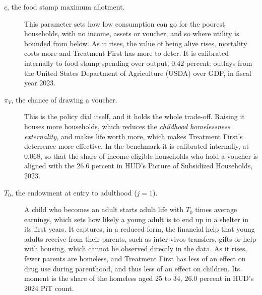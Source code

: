 \documentclass[10pt]{article}
\begin{document}
\begin{description}
\item[$\underline c$, the food stamp maximum allotment.] This parameter sets how low consumption can go for the poorest households, with no income, assets or voucher, and so where utility is bounded from below. As it rises, the value of being alive rises, mortality costs more and Treatment First has more to deter. It is calibrated internally to food stamp spending over output, $0.42$ percent: outlays from the United States Department of Agriculture (USDA) over GDP, in fiscal year 2023.
\item[$\pi_V$, the chance of drawing a voucher.] This is the policy dial itself, and it holds the whole trade-off. Raising it houses more households, which reduces the \emph{childhood homelessness externality}, and makes life worth more, which makes Treatment First's deterrence more effective. In the benchmark it is calibrated internally, at $0.068$, so that the share of income-eligible households who hold a voucher is aligned with the $26.6$ percent in HUD's Picture of Subsidized Households, 2023.
\item[$T_0$, the endowment at entry to adulthood ($j=1$).] A child who becomes an adult starts adult life with $T_0$ times average earnings, which sets how likely a young adult is to end up in a shelter in its first years. It captures, in a reduced form,
the financial help that young adults receive from their parents, such as inter vivos transfers, gifts or help with
housing, which cannot be observed directly in the data.   As it rises, fewer parents are homeless, and Treatment First has less of an effect on drug use during parenthood, and thus less of an effect on children. Its moment is the share of the homeless aged 25 to 34, $26.0$ percent in HUD's 2024 PiT count.
\end{description}
\end{document}
